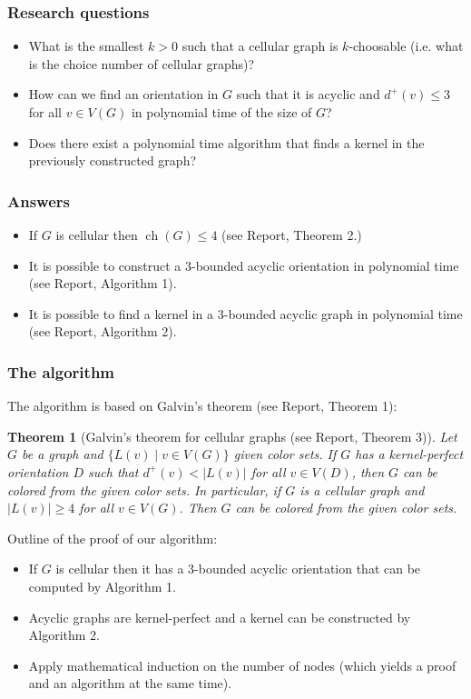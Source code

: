 \documentclass{beamer} %
\newtheorem{theo}[lem]{Theorem}
\DeclareMathOperator*{\ch}{ch}
\begin{document}
\begin{frame}
\frametitle{Research questions}
\justifying
\begin{itemize}
\item What is the smallest $k > 0$ such that a cellular graph is $k$-choosable (i.e. what is the choice number of cellular graphs)?
\pause \item How can we find an orientation in $G$ such that it is acyclic and $d^+(v) \leqslant 3$ for all $v \in V(G)$ in polynomial time of the size of $G$?
\pause \item Does there exist a polynomial time algorithm that finds a kernel in the previously constructed graph?

\end{itemize}
\end{frame}

\begin{frame}
\frametitle{Answers}
\justifying
\begin{itemize}
\item If $G$ is cellular then $\ch(G) \leqslant 4$ (see Report,  Theorem 2.)
\pause \item It is possible to construct a $3$-bounded acyclic orientation in polynomial time (see Report, Algorithm 1).
\pause \item It is possible to find a kernel in a $3$-bounded acyclic graph in polynomial time (see Report, Algorithm 2).
\end{itemize}
\end{frame}


\begin{frame}
\frametitle{The algorithm}
\justifying
The algorithm is based on Galvin's theorem (see Report, Theorem 1):
\begin{theo}[Galvin's theorem for cellular graphs (see Report, Theorem 3)] Let $G$ be a graph and $\lbrace L(v) \mid v \in V(G) \rbrace$ given color sets. If $G$ has a kernel-perfect orientation $D$ such that $d^+(v) < |L(v)|$ for all $v \in V(D)$, then $G$ can be colored from the given color sets.
In particular, if $G$ is a cellular graph and $|L(v)| \geqslant 4$ for all $v \in V(G)$. Then $G$ can be colored from the given color sets.
\end{theo}
\pause Outline of the proof of our algorithm:
\begin{itemize}
\item If $G$ is cellular then it has a $3$-bounded acyclic orientation that can be computed by Algorithm 1.
\pause \item Acyclic graphs are kernel-perfect and a kernel can be constructed by Algorithm 2.
\pause \item Apply mathematical induction on the number of nodes (which yields a proof and an algorithm at the same time).
\end{itemize}
\end{frame}
\end{document}
